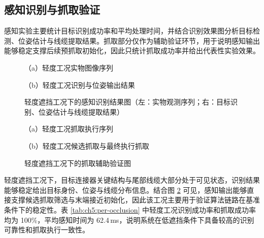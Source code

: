 \subsection{感知识别与抓取验证}
感知实验主要统计目标识别成功率和平均处理时间，并结合识别效果图分析目标检测、位姿估计与线缆提取结果。抓取部分仅作为辅助验证环节，用于说明感知输出能够稳定支撑后续预抓取初始化，因此只统计抓取成功率并给出代表性实验效果。

\begin{figure}[htbp]
  \centering
  \begin{minipage}[t]{0.48\textwidth}
    \centering
    
    {\small （a）轻度工况实物图像序列}
  \end{minipage}
  \hfill
  \begin{minipage}[t]{0.48\textwidth}
    \centering
    
    {\small （b）轻度工况识别与位姿输出结果}
  \end{minipage}
  \caption{轻度遮挡工况下的感知识别结果图（左：实物观测序列；右：目标识别、位姿估计与线缆提取结果）}
  \label{fig:ch5:occ-light}
\end{figure}

\begin{figure}[htbp]
  \centering
  \begin{minipage}[t]{0.48\textwidth}
    \centering
    
    {\small （a）轻度工况抓取执行序列}
  \end{minipage}
  \hfill
  \begin{minipage}[t]{0.48\textwidth}
    \centering
    
    {\small （b）轻度工况候选抓取与最终执行抓取}
  \end{minipage}
  \caption{轻度遮挡工况下的抓取辅助验证图}
  \label{fig:ch5:grasp-light}
\end{figure}

\noindent
轻度遮挡工况下，目标连接器关键结构与尾部线缆大部分处于可见状态，识别结果能够稳定给出目标身份、位姿与线缆分布信息。结合图 \ref{fig:ch5:grasp-light} 可见，感知输出能够直接支撑候选抓取筛选与末端接近初始化，因此该工况主要用于验证算法链路在基准条件下的稳定性。表 \ref{tab:ch5:per-occlusion} 中轻度工况识别成功率和抓取成功率均为 100\%，平均感知时间为 62.4\,ms，说明系统在低遮挡条件下具备较高的识别可靠性和抓取执行一致性。

